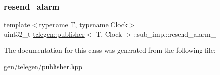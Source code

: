 \subsubsection{\texorpdfstring{resend\+\_\+alarm\+\_\+}{resend\_alarm\_}}
{\footnotesize\ttfamily template$<$typename T, typename Clock$>$ \\
uint32\+\_\+t \hyperlink{classtelegen_1_1publisher}{telegen\+::publisher}$<$ T, Clock $>$\+::sub\+\_\+impl\+::resend\+\_\+alarm\+\_\+}



The documentation for this class was generated from the following file\+:\begin{DoxyCompactItemize}
\item 
\hyperlink{gen_2telegen_2publisher_8hpp}{gen/telegen/publisher.\+hpp}\end{DoxyCompactItemize}
